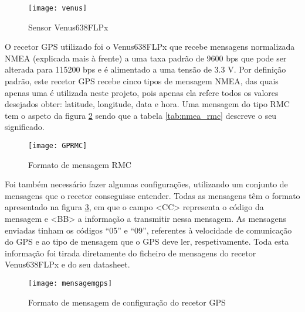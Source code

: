 \begin{figure}[hbtp]
	\centering
	\texttt{[image: venus]}
	\caption[Sensor Venus638FLPx]{Sensor Venus638FLPx \footnotemark}
	\label{fig:sensor_venus638FLPx}
\end{figure}


O recetor GPS utilizado foi o Venus638FLPx que recebe mensagens normalizada NMEA (explicada mais à frente) a uma taxa padrão de 9600 bps que pode ser alterada para 115200 bps e é alimentado a uma tensão de 3.3 V.
Por definição padrão, este recetor GPS recebe cinco tipos de mensagem NMEA, das quais apenas uma é utilizada neste projeto, pois apenas ela refere todos os valores desejados obter: latitude, longitude, data e hora.
Uma mensagem do tipo RMC tem o aspeto da figura \ref{fig:formato_de_mensagem_rmc} sendo que a tabela \ref{tab:nmea_rmc} descreve o seu significado.

\begin{figure}[hbtp]
	\centering
	\texttt{[image: GPRMC]}
	\caption{Formato de mensagem RMC}
	\label{fig:formato_de_mensagem_rmc}
\end{figure}

Foi também necessário fazer algumas configurações, utilizando um conjunto de mensagens que o recetor conseguisse entender.
Todas as mensagens têm o formato apresentado na figura \ref{fig:formato_de_mensagem_de_configuracao_do_recetor_gps}, em que o campo <CC> representa o código da mensagem e <BB> a informação a transmitir nessa mensagem.
As mensagens enviadas tinham os códigos ``05'' e ``09'', referentes à velocidade de comunicação do GPS e ao tipo de mensagem que o GPS deve ler, respetivamente.
Toda esta informação foi tirada diretamente do ficheiro de mensagens do recetor Venus638FLPx e do seu datasheet.

\begin{figure}[hbtp]
	\centering
	\texttt{[image: mensagemgps]}
	\caption{Formato de mensagem de configuração do recetor GPS}
	\label{fig:formato_de_mensagem_de_configuracao_do_recetor_gps}
\end{figure}

